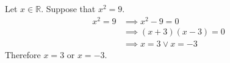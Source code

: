 Let $x \in \mathbb{R}$.
Suppose that $x^{2} = 9$.
\begin{align*}
  x^{2} = 9 &\implies x^{2} - 9 = 0 \tag*{subtraction} \\
  &\implies (x + 3)(x - 3) = 0 \tag*{factoring} \\
  &\implies x = 3 \lor x = -3 \tag*{the zero product property}
\end{align*}
Therefore $x = 3$ or $x = -3$.